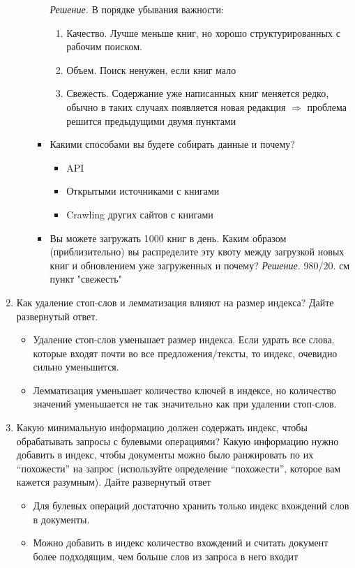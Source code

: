 \begin{enumerate}
\begin{enumerate}
\begin{itemize}
			\textit{Решение. }В порядке убывания важности:
			\begin{enumerate}
				\item Качество. Лучше меньше книг, но хорошо структурированных с рабочим поиском.
				\item Объем. Поиск ненужен, если книг мало
				\item Свежесть. Содержание уже написанных книг меняется редко, обычно в таких случаях появляется новая редакция $\Rightarrow$ проблема решится предыдущими двумя пунктами
			\end{enumerate}
			\item Какими способами вы будете собирать данные и почему?
			\begin{itemize}
				\item API
				\item Открытыми источниками с книгами
				\item Crawling других сайтов с книгами
			\end{itemize}
			\item Вы можете загружать 1000 книг в день. Каким образом (приблизительно) вы 
			распределите эту квоту между загрузкой новых книг и обновлением уже загруженных и
			почему?
			\textit{Решение.} 980/20. см пункт "свежесть"
		\end{itemize}
	\end{enumerate}
	
	\item  Как удаление стоп-слов и лемматизация влияют на размер индекса? Дайте	
	развернутый ответ.
	
	\begin{itemize}
		\item Удаление стоп-слов уменьшает размер индекса. Если удрать все слова, которые входят почти во все предложения/тексты, то индекс, очевидно сильно уменьшится.
		\item Лемматизация уменьшает количество ключей в индексе, но количество значений уменьшается не так значительно как при удалении стоп-слов.
	\end{itemize}
		
	\item Какую минимальную информацию должен содержать индекс, чтобы обрабатывать запросы с 
	булевыми операциями? Какую информацию нужно добавить в индекс, чтобы документы можно было 
	ранжировать по их “похожести” на запрос (используйте определение “похожести”, которое вам 
	кажется разумным). Дайте развернутый ответ
	
	\begin{itemize}
		\item Для булевых операций достаточно хранить только индекс вхождений слов в документы.
		\item Можно добавить в индекс количество вхождений и считать документ более подходящим, чем больше слов из запроса в него входит
	\end{itemize}
\end{enumerate}
